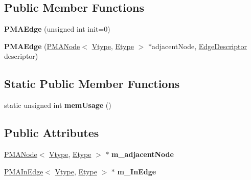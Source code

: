 \subsection*{Public Member Functions}
\begin{DoxyCompactItemize}
\item 
\hypertarget{class_p_m_a_edge_ac9d50f4ea8deea74c13353d454f948fc}{
{\bfseries PMAEdge} (unsigned int init=0)}
\label{class_p_m_a_edge_ac9d50f4ea8deea74c13353d454f948fc}

\item 
\hypertarget{class_p_m_a_edge_aa74fda5a9a251c2ef284d4ee068d97aa}{
{\bfseries PMAEdge} (\hyperlink{class_p_m_a_node}{PMANode}$<$ \hyperlink{class_vtype}{Vtype}, \hyperlink{class_etype}{Etype} $>$ $\ast$adjacentNode, \hyperlink{class_p_m_a_edge}{EdgeDescriptor} descriptor)}
\label{class_p_m_a_edge_aa74fda5a9a251c2ef284d4ee068d97aa}

\end{DoxyCompactItemize}
\subsection*{Static Public Member Functions}
\begin{DoxyCompactItemize}
\item 
\hypertarget{class_p_m_a_edge_ae0c3a84a3ae2e59103abb4e70cd19a7e}{
static unsigned int {\bfseries memUsage} ()}
\label{class_p_m_a_edge_ae0c3a84a3ae2e59103abb4e70cd19a7e}

\end{DoxyCompactItemize}
\subsection*{Public Attributes}
\begin{DoxyCompactItemize}
\item 
\hypertarget{class_p_m_a_edge_a47bf703379aa35b86647a21b5476bff6}{
\hyperlink{class_p_m_a_node}{PMANode}$<$ \hyperlink{class_vtype}{Vtype}, \hyperlink{class_etype}{Etype} $>$ $\ast$ {\bfseries m\_\-adjacentNode}}
\label{class_p_m_a_edge_a47bf703379aa35b86647a21b5476bff6}

\item 
\hypertarget{class_p_m_a_edge_aa1a72d424a5cb48d505e4f7044dfbfb1}{
\hyperlink{class_p_m_a_in_edge}{PMAInEdge}$<$ \hyperlink{class_vtype}{Vtype}, \hyperlink{class_etype}{Etype} $>$ $\ast$ {\bfseries m\_\-InEdge}}
\label{class_p_m_a_edge_aa1a72d424a5cb48d505e4f7044dfbfb1}

\end{DoxyCompactItemize}
